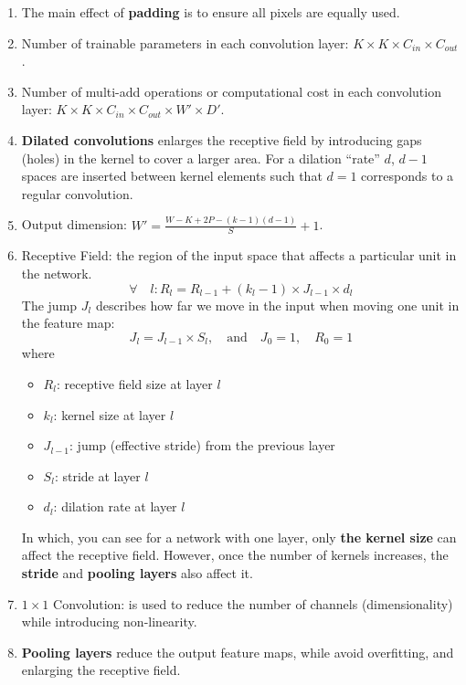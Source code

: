 \documentclass[12pt]{article}
\begin{document}
\begin{enumerate}
    \item The main effect of \textbf{padding} is to ensure all pixels are equally used.

    \item Number of trainable parameters in each convolution layer: $K \times K \times C_{in} \times C_{out}$.

    \item Number of multi-add operations or computational cost in each convolution layer: $K \times K \times C_{in} \times C_{out} \times W' \times D'$.

    \item \textbf{Dilated convolutions} enlarges the receptive field by introducing gaps (holes) in the kernel to cover a larger area.  For a dilation “rate” $d$, $d-1$ spaces are inserted between kernel elements such that $d = 1$ corresponds to a regular convolution.

    \item Output dimension: $W' = \frac{W-K+2P -(k-1)(d-1)}{S} + 1$.

    \item Receptive Field: the region of the input space that affects a particular unit in the network.
    \[\forall \quad l: R_l = R_{l-1} + (k_{l} - 1) \times J_{l-1} \times d_l\]
    The jump $J_l$ describes how far we move in the input when moving one unit in the feature map:
    \[
    J_{l} = J_{l-1} \times S_{l}, \quad \text{and} \quad J_0 = 1, \quad R_0 = 1
    \]
    where
    \begin{itemize}
        \item $R_l$: receptive field size at layer $l$
        \item $k_{l}$: kernel size at layer $l$
        \item $J_{l-1}$: jump (effective stride) from the previous layer
        \item $S_{l}$: stride at layer $l$
        \item $d_l$: dilation rate at layer $l$
    \end{itemize}
    In which, you can see for a network with one layer, only \textbf{the kernel size} can affect the receptive field. However, once the number of kernels increases, the \textbf{stride} and \textbf{pooling layers} also affect it.

    \item $1 \times 1$ Convolution: is used to reduce the number of channels (dimensionality) while introducing non-linearity.

    \item \textbf{Pooling layers} reduce the output feature maps, while avoid overfitting, and enlarging the receptive field.


\end{enumerate}
\end{document}
